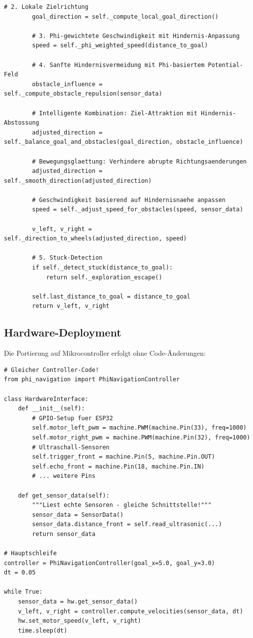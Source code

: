 ﻿\documentclass[a4paper,12pt]{article}
\theoremstyle{definition}
\begin{document}
\begin{lstlisting}[style=pythonstyle, caption={Methode \texttt{\_autonomous\_behavior}}, label={lst:ab}]
        # 2. Lokale Zielrichtung
        goal_direction = self._compute_local_goal_direction()
        
        # 3. Phi-gewichtete Geschwindigkeit mit Hindernis-Anpassung
        speed = self._phi_weighted_speed(distance_to_goal)
        
        # 4. Sanfte Hindernisvermeidung mit Phi-basiertem Potential-Feld
        obstacle_influence = self._compute_obstacle_repulsion(sensor_data)
        
        # Intelligente Kombination: Ziel-Attraktion mit Hindernis-Abstossung
        adjusted_direction = self._balance_goal_and_obstacles(goal_direction, obstacle_influence)
        
        # Bewegungsglaettung: Verhindere abrupte Richtungsaenderungen
        adjusted_direction = self._smooth_direction(adjusted_direction)
        
        # Geschwindigkeit basierend auf Hindernisnaehe anpassen
        speed = self._adjust_speed_for_obstacles(speed, sensor_data)
        
        v_left, v_right = self._direction_to_wheels(adjusted_direction, speed)
        
        # 5. Stuck-Detection
        if self._detect_stuck(distance_to_goal):
            return self._exploration_escape()
        
        self.last_distance_to_goal = distance_to_goal
        return v_left, v_right
\end{lstlisting}

\subsection{Hardware-Deployment}

Die Portierung auf Mikrocontroller erfolgt ohne Code-Änderungen:

\begin{lstlisting}[style=pythonstyle, caption={ESP32 MicroPython Deployment}]
# Gleicher Controller-Code!
from phi_navigation import PhiNavigationController

class HardwareInterface:
    def __init__(self):
        # GPIO-Setup fuer ESP32
        self.motor_left_pwm = machine.PWM(machine.Pin(33), freq=1000)
        self.motor_right_pwm = machine.PWM(machine.Pin(32), freq=1000)
        # Ultraschall-Sensoren
        self.trigger_front = machine.Pin(5, machine.Pin.OUT)
        self.echo_front = machine.Pin(18, machine.Pin.IN)
        # ... weitere Pins
    
    def get_sensor_data(self):
        """Liest echte Sensoren - gleiche Schnittstelle!"""
        sensor_data = SensorData()
        sensor_data.distance_front = self.read_ultrasonic(...)
        return sensor_data

# Hauptschleife
controller = PhiNavigationController(goal_x=5.0, goal_y=3.0)
dt = 0.05

while True:
    sensor_data = hw.get_sensor_data()
    v_left, v_right = controller.compute_velocities(sensor_data, dt)
    hw.set_motor_speed(v_left, v_right)
    time.sleep(dt)
\end{lstlisting}
\end{document}
